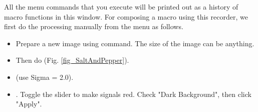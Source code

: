 All the menu commands that you execute will be printed out as a history of macro functions in this window. For composing a macro using this recorder, we first do the processing manually from the menu as follows.

\begin{itemize}
  \item Prepare a new image using  command. The size of the image can be anything.
  \item Then do  (Fig.
  \ref{fig_SaltAndPepper}).
  \item {} (use Sigma = 2.0).
  \item {}. Toggle the slider to make
  signals red. Check "Dark Background", then click "Apply".

\end{itemize}